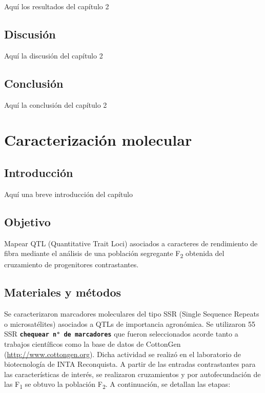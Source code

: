\documentclass[12pt,oneside]{reedthesis}
\begin{document}
Aquí los resultados del capítulo 2

\section{Discusión}\label{discusiuxf3n-1}

Aquí la discusión del capítulo 2

\section{Conclusión}\label{conclusiuxf3n-1}

Aquí la conclusión del capítulo 2

\chapter{Caracterización molecular}\label{ref-labels}

\section{Introducción}\label{introducciuxf3n-3}

Aquí una breve introducción del capítulo

\section{Objetivo}\label{objetivo-2}

Mapear QTL (Quantitative Trait Loci) asociados a caracteres de rendimiento de fibra mediante el análisis de una población segregante F\textsubscript{2} obtenida del cruzamiento de progenitores contrastantes.

\section{Materiales y métodos}\label{materiales-y-muxe9todos-2}

Se caracterizaron marcadores moleculares del tipo SSR (Single Sequence Repeats o microsatélites) asociados a QTLs de importancia agronómica. Se utilizaron 55 SSR \textbf{\texttt{chequear\ n°\ de\ marcadores}} que fueron seleccionados acorde tanto a trabajos científicos \autocite{zhang2005,shen2007,wang2007,wang2014,xia2014,wang2015,an2010,liu2012,qin2015,shi2015,su2016,zhang2016,ademe2017,liu2017,iqbal2017,li2017,baytar2018,liu2018} como la base de datos de CottonGen (\url{http://www.cottongen.org}). Dicha actividad se realizó en el laboratorio de biotecnología de INTA Reconquista. A partir de las entradas contrastantes para las características de interés, se realizaron cruzamientos y por autofecundación de las F\textsubscript{1} se obtuvo la población F\textsubscript{2}. A continuación, se detallan las etapas:
\end{document}
